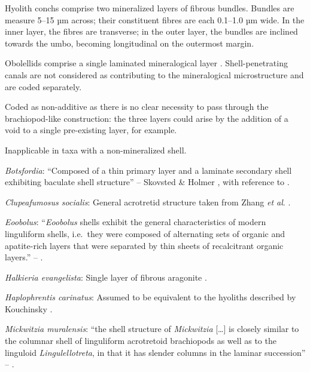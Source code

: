 \documentclass[openany]{book}
\theoremstyle{definition}
\theoremstyle{definition}
\theoremstyle{definition}
\theoremstyle{remark}
\begin{document}
Hyolith conchs comprise two mineralized layers of fibrous bundles.
Bundles are measure 5--15 µm across; their constituent fibres are each
0.1--1.0 µm wide. In the inner layer, the fibres are transverse; in the
outer layer, the bundles are inclined towards the umbo, becoming
longitudinal on the outermost margin.

Obolellids comprise a single laminated mineralogical layer
\citep{Balthasar2008iMummpikia}. Shell-penetrating canals are not
considered as contributing to the mineralogical microstructure and are
coded separately.

Coded as non-additive as there is no clear necessity to pass through the
brachiopod-like construction: the three layers could arise by the
addition of a void to a single pre-existing layer, for example.

Inapplicable in taxa with a non-mineralized shell.

\hypertarget{Botsfordia-coding-113}{}
\emph{Botsfordia}: ``Composed of a thin primary layer and a laminate
secondary shell exhibiting baculate shell structure'' -- Skovsted \&
Holmer \citeyearpar{Skovsted2005EarlyCambrian}, with reference to
\citet{Skovsted2003EarlyCambrian}.

\hypertarget{Clupeafumosus_socialis-coding-113}{}
\emph{Clupeafumosus socialis}: General acrotretid structure taken from
Zhang \emph{et al}. \citeyearpar{Zhang2016Epithelialcell}.

\hypertarget{Eoobolus-coding-113}{}
\emph{Eoobolus}: ``\emph{Eoobolus} shells exhibit the general
characteristics of modern linguliform shells, i.e.~they were composed of
alternating sets of organic and apatite-rich layers that were separated
by thin sheets of recalcitrant organic layers.'' --
\citet{Balthasar2007Anearly}.

\hypertarget{Halkieria_evangelista-coding-113}{}
\emph{Halkieria evangelista}: Single layer of fibrous aragonite
\citep{Porter2008}.

\hypertarget{Haplophrentis_carinatus-coding-113}{}
\emph{Haplophrentis carinatus}: Assumed to be equivalent to the hyoliths
described by Kouchinsky
\citeyearpar{Kouchinsky2000Skeletalmicrostructures}.

\hypertarget{Mickwitzia_muralensis-coding-113}{}
\emph{Mickwitzia muralensis}: ``the shell structure of \emph{Mickwitzia}
{[}\ldots{}{]} is closely similar to the columnar shell of linguliform
acrotretoid brachiopods as well as to the linguloid
\emph{Lingulellotreta}, in that it has slender columns in the laminar
succession'' -- \citet{Williams2007Supplement}.
\end{document}
